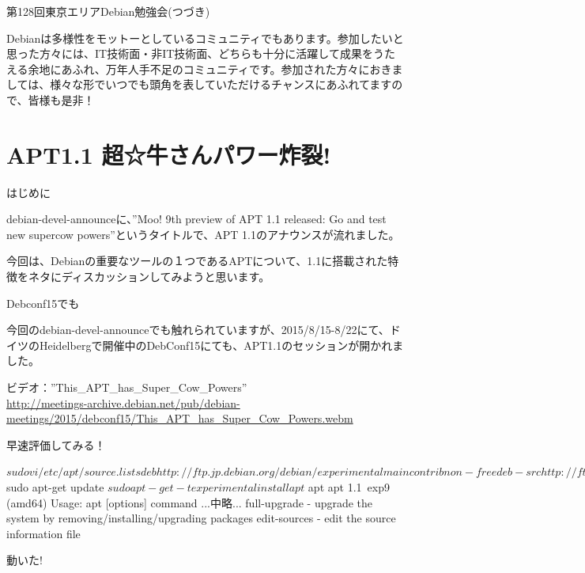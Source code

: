\begin{frame}{第128回東京エリアDebian勉強会(つづき)}
  
  Debianは多様性をモットーとしているコミュニティでもあります。参加したいと思った方々には、IT技術面・非IT技術面、どちらも十分に活躍して成果をうたえる余地にあふれ、万年人手不足のコミュニティです。参加された方々におきましては、様々な形でいつでも頭角を表していただけるチャンスにあふれてますので、皆様も是非！

\end{frame}

\section{APT1.1 超☆牛さんパワー炸裂!}

\begin{frame}{はじめに}

  debian-devel-announceに、''Moo! 9th preview of APT 1.1 released: Go and test new supercow powers''というタイトルで、APT 1.1のアナウンスが流れました。

  今回は、Debianの重要なツールの１つであるAPTについて、1.1に搭載された特徴をネタにディスカッションしてみようと思います。
  
\end{frame}

\begin{frame}{Debconf15でも}

  今回のdebian-devel-announceでも触れられていますが、2015/8/15-8/22にて、ドイツのHeidelbergで開催中のDebConf15にても、APT1.1のセッションが開かれました。

  ビデオ：''This\_APT\_has\_Super\_Cow\_Powers''\\
  \url{http://meetings-archive.debian.net/pub/debian-meetings/2015/debconf15/This_APT_has_Super_Cow_Powers.webm}
  
\end{frame}

\begin{frame}[containsverbatim]{早速評価してみる！}

\begin{commandlinesmall}
$ sudo vi /etc/apt/source.lists
deb http://ftp.jp.debian.org/debian/ experimental main contrib non-free
deb-src http://ftp.jp.debian.org/debian/ experimental main contrib non-free
$ sudo apt-get update
$ sudo apt-get -t experimental install apt
$ apt
apt 1.1~exp9 (amd64)
Usage: apt [options] command
...中略...
 full-upgrade - upgrade the system by removing/installing/upgrading packages
 edit-sources - edit the source information file
\end{commandlinesmall}
\begin{center}
{\LARGE 動いた!}
\end{center}
\end{frame}

